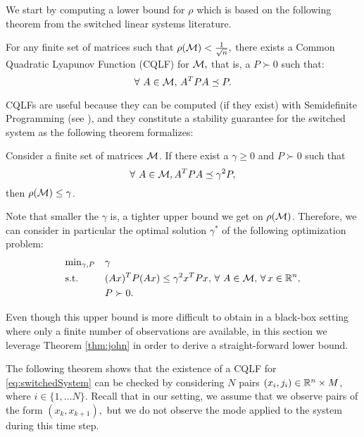We start by computing a lower bound for $\rho$ which is based on the following theorem from the switched linear systems literature.
\begin{theorem}\cite[Theorem 2.11]{jungers_lncis}\label{thm:john}
For any finite set of matrices such that $\rho(\mathcal{M})<\frac{1}{\sqrt{n}},$ there exists a Common Quadratic Lyapunov Function (CQLF) for $\mathcal{M},$ that is, a $P\succ 0$ such that: $$\forall\ A\in \mathcal{M},\, A^TPA\preceq P. $$
\end{theorem}

CQLFs are useful because they can be computed (if they exist) with Semidefinite Programming (see \cite{boyd}), and they constitute a stability guarantee for the switched system as the following theorem formalizes:
\begin{theorem}\cite[Prop. 2.8]{jungers_lncis}\label{thm:cqlf} Consider a finite set of matrices $\mathcal{M}$. If there exist a $\gamma \geq 0$ and $P \succ 0$ such that $$\forall\ A \in \mathcal{M}, A^TPA \preceq \gamma^2P,$$ then $\rho(\mathcal{M}) \leq \gamma$.
\end{theorem}
Note that smaller the $\gamma$ is, a tighter upper bound we get on $\rho(\mathcal{M})$. Therefore, we can consider in particular the optimal solution $\gamma^*$ of the following optimization problem:
\begin{equation}\label{eqn:campiOpt0}
\begin{aligned}
& \text{min}_{\gamma, P} & & \gamma \\
& \text{s.t.} 
&  & (Ax)^TP(Ax) \leq \gamma^2 x^TPx,\,\forall\ A \in \mathcal{M}, \,\forall\, x \in \mathbb{R}^n,\\
& && P \succ 0. \\
\end{aligned}
\end{equation}

Even though this upper bound is more difficult to obtain in a black-box setting where only a finite number of observations are available, in this section we leverage Theorem \ref{thm:john} in order to derive a straight-forward lower bound.

The following theorem shows that the existence of a CQLF for \eqref{eq:switchedSystem} can be checked by considering $N$ pairs $(x_i, j_i) \in \mathbb{R}^n \times M$, where $i \in \{1, \ldots N\}.$ Recall that in our setting, we assume that we observe pairs of the form $(x_k,x_{k+1}),$ but we do not observe the mode applied to the system during this time step.
%

